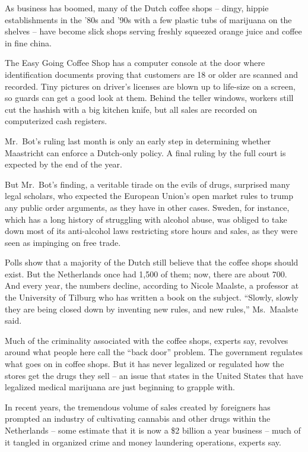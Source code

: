 ﻿\documentclass[12pt]{article}
\begin{document}
As business has boomed, many of the Dutch coffee shops -- dingy, hippie establishments in the '80s
and '90s with a few plastic tubs of marijuana on the shelves -- have become slick shops serving
freshly squeezed orange juice and coffee in fine china.

The Easy Going Coffee Shop has a computer console at the door where identification documents proving
that customers are 18 or older are scanned and recorded. Tiny pictures on driver's licenses are
blown up to life-size on a screen, so guards can get a good look at them. Behind the teller windows,
workers still cut the hashish with a big kitchen knife, but all sales are recorded on computerized
cash registers.

Mr.~Bot's ruling last month is only an early step in determining whether Maastricht can enforce a
Dutch-only policy. A final ruling by the full court is expected by the end of the year.

But Mr.~Bot's finding, a veritable tirade on the evils of drugs, surprised many legal scholars, who
expected the European Union's open market rules to trump any public order arguments, as they have in
other cases. Sweden, for instance, which has a long history of struggling with alcohol abuse, was
obliged to take down most of its anti-alcohol laws restricting store hours and sales, as they were
seen as impinging on free trade.

Polls show that a majority of the Dutch still believe that the coffee shops should exist. But the
Netherlands once had 1,500 of them; now, there are about 700. And every year, the numbers decline,
according to Nicole Maalste, a professor at the University of Tilburg who has written a book on the
subject. ``Slowly, slowly they are being closed down by inventing new rules, and new rules,''
Ms.~Maalste said.

Much of the criminality associated with the coffee shops, experts say, revolves around what people
here call the ``back door'' problem. The government regulates what goes on in coffee shops. But it
has never legalized or regulated how the stores get the drugs they sell -- an issue that states in
the United States that have legalized medical marijuana are just beginning to grapple with.

In recent years, the tremendous volume of sales created by foreigners has prompted an industry of
cultivating cannabis and other drugs within the Netherlands -- some estimate that it is now a \$2
billion a year business -- much of it tangled in organized crime and money laundering operations,
experts say.
\end{document}
